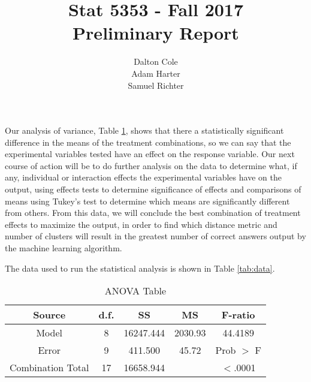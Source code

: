 \documentclass[times]{article}
\begin{document}
	\title{Stat 5353  - Fall 2017 \\ Preliminary Report}
	\author{Dalton Cole \\ Adam Harter \\ Samuel Richter}
	\date{}
	\maketitle
	
	Our analysis of variance, Table \ref{tab:anova}, shows that there a statistically significant difference in the means of the treatment combinations, so we can say that the experimental variables tested have an effect on the response variable. Our next course of action will be to do further analysis on the data to determine what, if any, individual or interaction effects the experimental variables have on the output, using effects tests to determine significance of effects and comparisons of means using Tukey’s test to determine which means are significantly different from others. From this data, we will conclude the best combination of treatment effects to maximize the output, in order to find which distance metric and number of clusters will result in the greatest number of correct answers output by the machine learning algorithm.

	The data used to run the statistical analysis is shown in Table \ref{tab:data}.



	\begin{table}[!h]
		\centering
		\caption{ANOVA Table}
		\label{tab:anova}
		\begin{tabular}{| c | c | c | c | c |}
			\hline
			Source 					& d.f.	& SS		& MS 		& F-ratio 	\\
			\hline
			Model					& 8		& 16247.444	& 2030.93	& 44.4189	\\
			\hline
			Error					& 9		& 411.500	& 45.72		& Prob $>$ F	\\
			\hline
			Combination Total		& 17	& 16658.944	& 			& $<$.0001 	\\
			\hline
		\end{tabular}
	\end{table}
\end{document}
